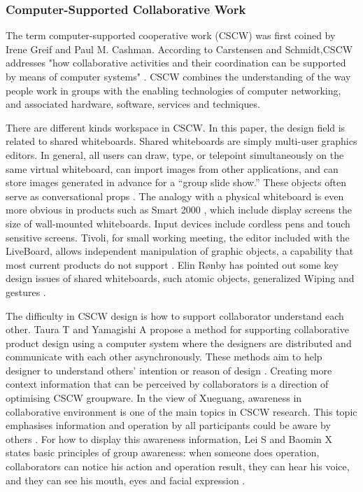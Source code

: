 \documentclass[12pt,twoside]{article}
\begin{document}
\subsubsection{Computer-Supported Collaborative Work}

The term computer-supported cooperative work (CSCW) was first coined by Irene Greif and Paul M. Cashman. According to Carstensen and Schmidt,CSCW addresses "how collaborative activities and their coordination can be supported by means of computer systems" \cite{carstensen1999computer}.  CSCW combines the understanding of the way people work in groups with the enabling technologies of computer networking, and associated hardware, software, services and techniques.

There are different kinds workspace in CSCW. In this paper, the design field is related to shared whiteboards. Shared whiteboards are simply multi-user graphics editors. In general, all users can draw, type, or telepoint simultaneously on the same virtual whiteboard, can import images from other applications, and can store images generated in advance for a “group slide show.” These objects often serve as conversational props \cite{brinck1992collaborative}. The analogy with a physical whiteboard is even more obvious in products such as Smart 2000 \cite{martin1995smart}, which include display screens the size of wall-mounted whiteboards. Input devices include cordless pens and touch sensitive screens. Tivoli, for small working meeting, the editor included with the LiveBoard, allows independent manipulation of graphic objects, a capability that most current products do not support \cite{moran1995some}. Elin Rønby has pointed out some key design issues of shared whiteboards, such atomic objects, generalized Wiping and gestures \cite{pedersen1993tivoli}. 

The difficulty in CSCW design is how to support collaborator understand each other. Taura T and Yamagishi A propose a method for supporting collaborative product design using a computer system where the designers are distributed and communicate with each other asynchronously. These methods aim to help designer to understand others’ intention or reason of design \cite{taura1997collaboration}.  Creating more context information that can be perceived by collaborators is a direction of optimising CSCW groupware. In the view of Xueguang, awareness in collaborative environment is one of the main topics in CSCW research. This topic emphasises information and operation by all participants could be aware by others \cite{xueguang2004research}. For how to display this awareness information, Lei S and Baomin X states basic principles of group awareness: when someone does operation, collaborators can notice his action and operation result, they can hear his voice, and they can see his mouth, eyes and facial expression \cite{lei2002human}. 
\end{document}
